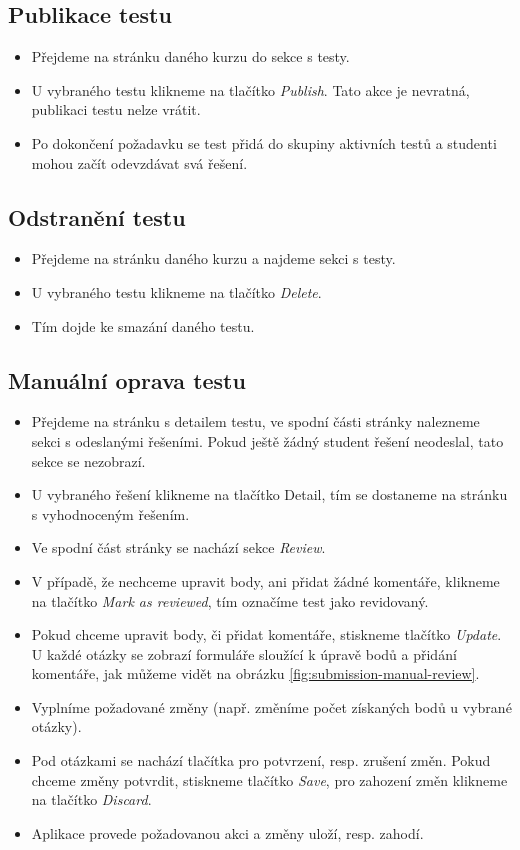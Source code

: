 \subsection{Publikace testu}
\begin{itemize}
	\item Přejdeme na stránku daného kurzu do sekce s testy.
	\item U vybraného testu klikneme na tlačítko \textit{Publish}. Tato akce je nevratná, publikaci testu nelze vrátit.
	\item Po dokončení požadavku se test přidá do skupiny aktivních testů a studenti mohou začít odevzdávat svá řešení.
\end{itemize}

\subsection{Odstranění testu}
\begin{itemize}
	\item Přejdeme na stránku daného kurzu a najdeme sekci s testy.
	\item U vybraného testu klikneme na tlačítko \textit{Delete}.
	\item Tím dojde ke smazání daného testu.
\end{itemize}

\subsection{Manuální oprava testu}
\begin{itemize}
	\item Přejdeme na stránku s detailem testu, ve spodní části stránky nalezneme sekci s odeslanými řešeními. Pokud ještě žádný student řešení neodeslal, tato sekce se nezobrazí.
	\item U vybraného řešení klikneme na tlačítko Detail, tím se dostaneme na strá\-nku s vyhodnoceným řešením.
	\item Ve spodní část stránky se nachází sekce \textit{Review}.
	\item V případě, že nechceme upravit body, ani přidat žádné komentáře, klikneme na tlačítko \textit{Mark as reviewed}, tím označíme test jako revidovaný.
	\item Pokud chceme upravit body, či přidat komentáře, stiskneme tlačítko \textit{Update}. U každé otázky se zobrazí formuláře sloužící k úpravě bodů a přidání komentáře, jak můžeme vidět na obrázku \ref{fig:submission-manual-review}.
	\item Vyplníme požadované změny (např. změníme počet získaných bodů u vybrané otázky).
	\item Pod otázkami se nachází tlačítka pro potvrzení, resp. zrušení změn. Pokud chceme změny potvrdit, stiskneme tlačítko \textit{Save}, pro zahození změn klikneme na tlačítko \textit{Discard}.
	\item Aplikace provede požadovanou akci a změny uloží, resp. zahodí.
\end{itemize}

